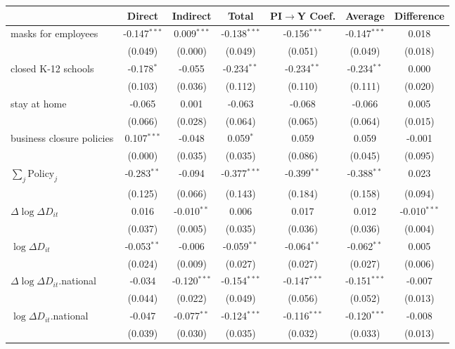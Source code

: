 
\begin{tabular}{lccccc|>{}c}
\toprule
  & Direct & Indirect & Total & PI$\to$Y Coef. & Average & Difference\\
\midrule
masks for employees & -0.147$^{***}$ & 0.009$^{***}$ & -0.138$^{***}$ & -0.156$^{***}$ & -0.147$^{***}$ & 0.018\\
 & (0.049) & (0.000) & (0.049) & (0.051) & (0.049) & (0.018)\\
closed K-12 schools & -0.178$^{*}$ & -0.055 & -0.234$^{**}$ & -0.234$^{**}$ & -0.234$^{**}$ & 0.000\\
 & (0.103) & (0.036) & (0.112) & (0.110) & (0.111) & (0.020)\\
stay at home & -0.065 & 0.001 & -0.063 & -0.068 & -0.066 & 0.005\\
 & (0.066) & (0.028) & (0.064) & (0.065) & (0.064) & (0.015)\\
business closure policies & 0.107$^{***}$ & -0.048 & 0.059$^{*}$ & 0.059 & 0.059 & -0.001\\
 & (0.000) & (0.035) & (0.035) & (0.086) & (0.045) & (0.095)\\
$\sum_j \mathrm{Policy}_j$ & -0.283$^{**}$ & -0.094 & -0.377$^{***}$ & -0.399$^{**}$ & -0.388$^{**}$ & 0.023\\
 & (0.125) & (0.066) & (0.143) & (0.184) & (0.158) & (0.094)\\
$\Delta \log \Delta D_{it}$ & 0.016 & -0.010$^{**}$ & 0.006 & 0.017 & 0.012 & -0.010$^{***}$\\
 & (0.037) & (0.005) & (0.035) & (0.036) & (0.036) & (0.004)\\
$\log \Delta D_{it}$ & -0.053$^{**}$ & -0.006 & -0.059$^{**}$ & -0.064$^{**}$ & -0.062$^{**}$ & 0.005\\
 & (0.024) & (0.009) & (0.027) & (0.027) & (0.027) & (0.006)\\
$\Delta \log \Delta D_{it}$.national & -0.034 & -0.120$^{***}$ & -0.154$^{***}$ & -0.147$^{***}$ & -0.151$^{***}$ & -0.007\\
 & (0.044) & (0.022) & (0.049) & (0.056) & (0.052) & (0.013)\\
$\log \Delta D_{it}$.national & -0.047 & -0.077$^{**}$ & -0.124$^{***}$ & -0.116$^{***}$ & -0.120$^{***}$ & -0.008\\
 & (0.039) & (0.030) & (0.035) & (0.032) & (0.033) & (0.013)\\
\bottomrule
\end{tabular}